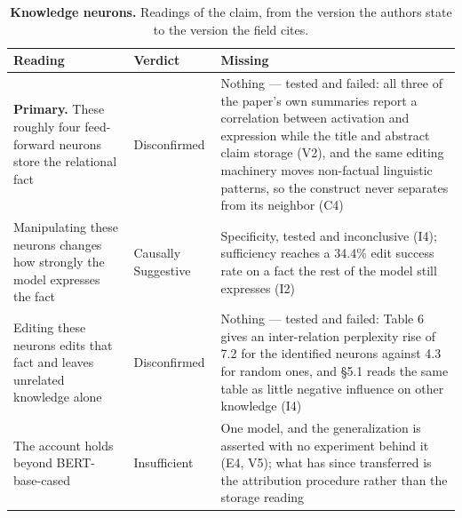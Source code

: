 \clearpage
\begin{table}[H]
\centering
\footnotesize
\caption{\textbf{Knowledge neurons.} Readings of the claim, from the version the authors state to the version the
field cites.}
\label{tab:knowledge_neurons-readings}
\renewcommand{\arraystretch}{1.18}
\begin{tabular}{@{}>{\raggedright\arraybackslash}p{3.3cm}l>{\raggedright\arraybackslash}p{4.4cm}@{}}
\toprule
\textbf{Reading} & \textbf{Verdict} & \textbf{Missing} \\
\midrule
\textbf{Primary.} These roughly four feed-forward neurons store the relational fact
  & Disconfirmed
  & Nothing --- tested and failed: all three of the paper's own summaries report a correlation between activation and expression while the title and abstract claim storage (V2), and the same editing machinery moves non-factual linguistic patterns, so the construct never separates from its neighbor (C4) \\
\addlinespace[2pt]
Manipulating these neurons changes how strongly the model expresses the fact
  & Causally Suggestive
  & Specificity, tested and inconclusive (I4); sufficiency reaches a 34.4\% edit success rate on a fact the rest of the model still expresses (I2) \\
\addlinespace[2pt]
Editing these neurons edits that fact and leaves unrelated knowledge alone
  & Disconfirmed
  & Nothing --- tested and failed: Table 6 gives an inter-relation perplexity rise of 7.2 for the identified neurons against 4.3 for random ones, and \S5.1 reads the same table as little negative influence on other knowledge (I4) \\
\addlinespace[2pt]
The account holds beyond BERT-base-cased
  & Insufficient
  & One model, and the generalization is asserted with no experiment behind it (E4, V5); what has since transferred is the attribution procedure rather than the storage reading \\
\bottomrule
\end{tabular}
\end{table}

